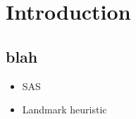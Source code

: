 \section{Introduction}
  \subsection*{blah}

\begin{frame}
  \begin{block}{}
    \begin{itemize}
      \item SAS\up{+}
      \item Landmark heuristic
    \end{itemize}

    
  \end{block}
\end{frame}

\begin{frame}
  \begin{block}{}

  \end{block}
\end{frame}

